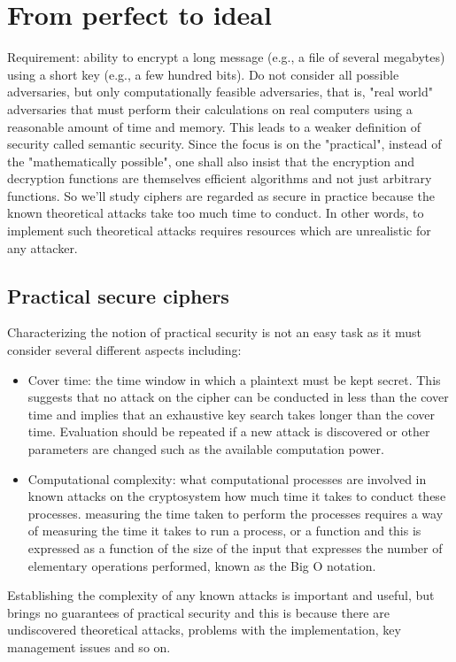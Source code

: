 \section{From perfect to ideal}
Requirement: ability to encrypt a long message (e.g., a file of several megabytes) using a short key (e.g., a few hundred bits). Do not consider all possible adversaries, but only computationally feasible adversaries, that is, "real world" adversaries that must perform their calculations on real computers using a reasonable amount of time and memory. This leads to a weaker definition of security called semantic security. Since the focus is on the "practical", instead of the "mathematically possible", one shall also insist that the encryption and decryption functions are themselves efficient algorithms and not just arbitrary functions.
So we'll study ciphers are regarded as secure in practice because the known theoretical attacks take too much time to conduct. In other words, to implement such theoretical attacks requires resources which are unrealistic for any attacker.

	\subsection{Practical secure ciphers}
	Characterizing the notion of practical security is not an easy task as it must consider several different aspects including:
	\begin{itemize}
		\item Cover time: the time window in which a plaintext must be kept secret. This suggests that no attack on the cipher can be conducted in less than the cover time and implies that an exhaustive key search takes longer than the cover time. Evaluation should be repeated if a new attack is discovered or other parameters are changed such as the available computation power.
		\item Computational complexity: what computational processes are involved in known attacks on the cryptosystem how much time it takes to conduct these processes. measuring the time taken to perform the processes requires a way of measuring the time it takes to run a process, or a function and this is expressed as a function of the size of the input that expresses the number of elementary operations performed, known as the Big O notation.
	\end{itemize}
	
	Establishing the complexity of any known attacks is important and useful, but brings no guarantees of practical security and this is because there are undiscovered theoretical attacks, problems with the implementation, key management issues and so on.
	
